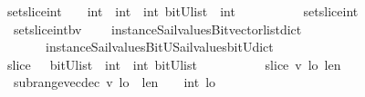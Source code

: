 \begin{isabellebody}
\isanewline
\isanewline
%
\isanewline
{}\isamarkupfalse%
\ set{\isacharunderscore}slice{\isacharunderscore}int\ \ {\isacharcolon}{\isacharcolon}\ {\isachardoublequoteopen}\ int\ {\isasymRightarrow}\ int\ {\isasymRightarrow}\ int\ {\isasymRightarrow}{\isacharparenleft}bitU{\isacharparenright}list\ {\isasymRightarrow}\ int\ {\isachardoublequoteclose}\ \ \ \isanewline
\ \ \ \ \ {\isachardoublequoteopen}\ set{\isacharunderscore}slice{\isacharunderscore}int\ {\isacharequal}\ {\isacharparenleft}\ \isanewline
\ \ set{\isacharunderscore}slice{\isacharunderscore}int{\isacharunderscore}bv\isanewline
\ \ \ \ {\isacharparenleft}instance{\isacharunderscore}Sail{}{\isacharunderscore}values{\isacharunderscore}Bitvector{\isacharunderscore}list{\isacharunderscore}dict\isanewline
\ \ \ \ \ \ \ instance{\isacharunderscore}Sail{}{\isacharunderscore}values{\isacharunderscore}BitU{\isacharunderscore}Sail{}{\isacharunderscore}values{\isacharunderscore}bitU{\isacharunderscore}dict{\isacharparenright}\ {\isacharparenright}{\isachardoublequoteclose}\isanewline
\isanewline
\isanewline
%
\isanewline
{}\isamarkupfalse%
\ slice\ \ {\isacharcolon}{\isacharcolon}\ {\isachardoublequoteopen}{\isacharparenleft}bitU{\isacharparenright}list\ {\isasymRightarrow}\ int\ {\isasymRightarrow}\ int\ {\isasymRightarrow}{\isacharparenleft}bitU{\isacharparenright}list\ {\isachardoublequoteclose}\ \ \ \isanewline
\ \ \ \ \ {\isachardoublequoteopen}\ slice\ v\ lo\ len\ {\isacharequal}\ {\isacharparenleft}\isanewline
\ \ subrange{\isacharunderscore}vec{\isacharunderscore}dec\ v\ {\isacharparenleft}{\isacharparenleft}lo\ {\isacharplus}\ len{\isacharparenright}\ {\isacharminus}{\isacharparenleft}\ {}\ {\isacharcolon}{\isacharcolon}\ int{\isacharparenright}{\isacharparenright}\ lo\ {\isacharparenright}{\isachardoublequoteclose}\isanewline
\isanewline
\isanewline
%
\end{isabellebody}
